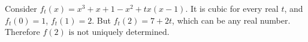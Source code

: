 Consider $f_t(x)=x^3+x+1-x^2+t x(x-1)$. It is cubic for every real $t$, and $f_t(0)=1$, $f_t(1)=2$. But $f_t(2)=7+2t$, which can be any real number. Therefore $\boxed{f(2)\text{ is not uniquely determined}}$.
